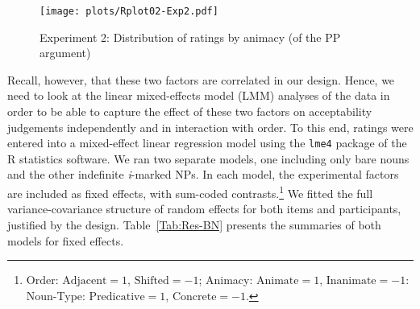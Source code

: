 \documentclass[output=paper]{langsci/langscibook}
\begin{document}
\begin{figure}[p]
	\texttt{[image: plots/Rplot02-Exp2.pdf]}
	\caption{Experiment 2: Distribution of ratings by animacy (of the PP argument)}\label{boxplot5}
\end{figure}



Recall, however, that these two factors are correlated in our design. Hence, we need to look at the linear mixed-effects model (LMM) analyses of the data \citep{baayen2008mixed} in order to be able to capture the effect of these two factors on acceptability judgements independently and in interaction with order. To this end, ratings were entered into a mixed-effect linear regression model using the \texttt{lme4} package \citep{bates2015lme4} of the R statistics software. We ran two separate models, one including only bare nouns and the other indefinite \textit{i}-marked NPs. In each model, the experimental factors are included as fixed effects, with sum-coded contrasts.\footnote{Order: $\text{Adjacent}=1$, $\text{Shifted}=-1$; Animacy: $\text{Animate}=1$, $\text{Inanimate}=-1$: Noun-Type: $\text{Predicative}=1$, $\text{Concrete}=-1$.} We fitted the full variance-covariance structure of random effects for both items and participants, justified by the design.  
Table~\ref{Tab:Res-BN} presents the summaries of both models for fixed effects. 
\end{document}

